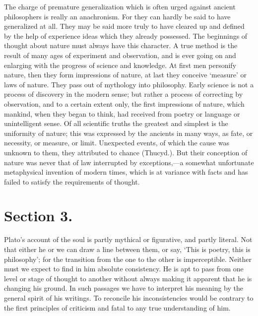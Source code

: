 \documentclass[11pt,letter]{article}
\begin{document}
\par  The charge of premature generalization which is often urged against ancient philosophers is really an anachronism. For they can hardly be said to have generalized at all. They may be said more truly to have cleared up and defined by the help of experience ideas which they already possessed. The beginnings of thought about nature must always have this character. A true method is the result of many ages of experiment and observation, and is ever going on and enlarging with the progress of science and knowledge. At first men personify nature, then they form impressions of nature, at last they conceive ‘measure’ or laws of nature. They pass out of mythology into philosophy. Early science is not a process of discovery in the modern sense; but rather a process of correcting by observation, and to a certain extent only, the first impressions of nature, which mankind, when they began to think, had received from poetry or language or unintelligent sense. Of all scientific truths the greatest and simplest is the uniformity of nature; this was expressed by the ancients in many ways, as fate, or necessity, or measure, or limit. Unexpected events, of which the cause was unknown to them, they attributed to chance (Thucyd.). But their conception of nature was never that of law interrupted by exceptions,—a somewhat unfortunate metaphysical invention of modern times, which is at variance with facts and has failed to satisfy the requirements of thought.

\par 
\section{
      Section 3.
    }
\par  Plato’s account of the soul is partly mythical or figurative, and partly literal. Not that either he or we can draw a line between them, or say, ‘This is poetry, this is philosophy’; for the transition from the one to the other is imperceptible. Neither must we expect to find in him absolute consistency. He is apt to pass from one level or stage of thought to another without always making it apparent that he is changing his ground. In such passages we have to interpret his meaning by the general spirit of his writings. To reconcile his inconsistencies would be contrary to the first principles of criticism and fatal to any true understanding of him.
\end{document}
